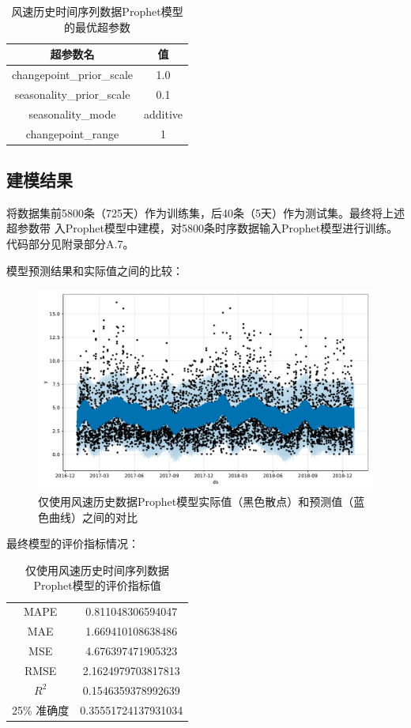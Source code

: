 \documentclass[AutoFakeBold]{LZUThesis}
\begin{document}
\begin{table}[H]
    \centering
    \caption{风速历史时间序列数据Prophet模型的最优超参数}
    \begin{tabular}{cc}
    \toprule
    超参数名 & 值 \\
    \midrule
    changepoint\_prior\_scale & 1.0 \\
    seasonality\_prior\_scale & 0.1 \\
    seasonality\_mode & additive \\
    changepoint\_range & 1 \\
    \bottomrule
    \end{tabular}
    \label{prophet_param}
\end{table}

\subsection{建模结果}

将数据集前5800条（725天）作为训练集，后40条（5天）作为测试集。最终将上述超参数带
入Prophet模型中建模，对5800条时序数据输入Prophet模型进行训练。代码部分见附录部分A.7。

模型预测结果和实际值之间的比较：

\begin{figure}[H]
	\centering
    \includegraphics[width=1\textwidth]{figures/prophet_wind.pdf}
    \caption{仅使用风速历史数据Prophet模型实际值（黑色散点）和预测值（蓝色曲线）之间的对比}
    \label{fig_prophet_wind}
\end{figure}

最终模型的评价指标情况：

\begin{table}[H]
    \centering
    \caption{仅使用风速历史时间序列数据Prophet模型的评价指标值}
    \begin{tabular}{cc}
    \toprule
    MAPE & 0.811048306594047 \\
    MAE & 1.669410108638486 \\
    MSE & 4.676397471905323 \\
    RMSE & 2.1624979703817813 \\
    $R^2$ & 0.1546359378992639 \\
    25\% 准确度 & 0.35551724137931034 \\
    \bottomrule
    \end{tabular}
    \label{wind_prophet_result}
\end{table}
\end{document}
